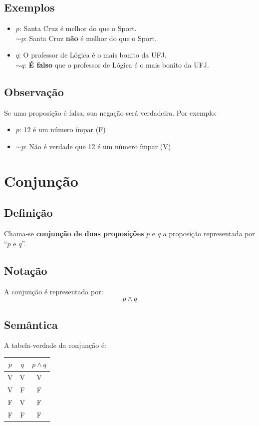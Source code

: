 \subsection{Exemplos}
\begin{itemize}
    \item $p$: Santa Cruz é melhor do que o Sport.\\
    $\sim p$: Santa Cruz \textbf{não} é melhor do que o Sport.

    \item $q$: O professor de Lógica é o mais bonito da UFJ.\\
    $\sim q$: \textbf{É falso} que o professor de Lógica é o mais bonito da UFJ.
\end{itemize}

\subsection{Observação}
Se uma proposição é falsa, sua negação será verdadeira. Por exemplo:
\begin{itemize}
    \item $p$: 12 é um número ímpar (F)\\
    \item $\sim p$: Não é verdade que 12 é um número ímpar (V)
\end{itemize}

\section{Conjunção}

\subsection{Definição}
Chama-se \textbf{conjunção de duas proposições} $p$ e $q$ a proposição representada por ``$p$ e $q$''.

\subsection{Notação}
A conjunção é representada por:
\[
p \wedge q
\]

\subsection{Semântica}
A tabela-verdade da conjunção é:

\begin{center}
\begin{tabular}{|cc|c|}
\hline
$p$ & $q$ & $p \wedge q$ \\
\hline
V & V & V \\
V & F & F \\
F & V & F \\
F & F & F \\
\hline
\end{tabular}
\end{center}

